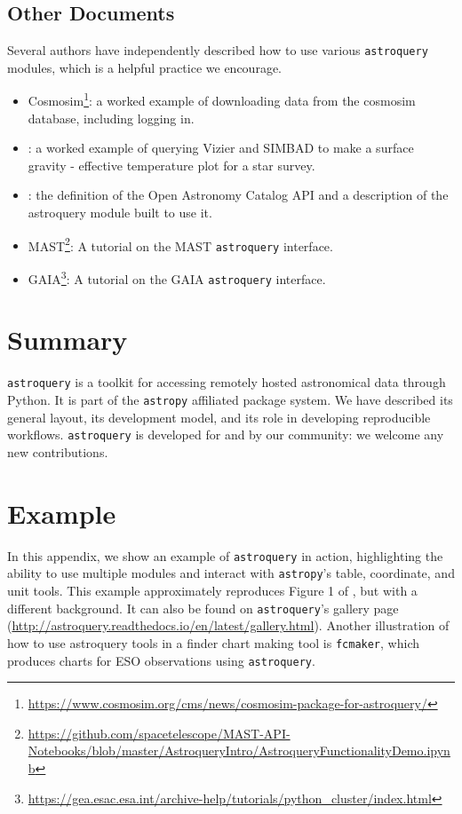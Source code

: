 \documentclass[twocolumn]{aastex62}
\newcommand{\package}[1]{\texttt{#1}\xspace}
\newcommand{\astroquery}{\package{astroquery}}
\newcommand{\astropypkg}{\package{astropy}}
\begin{document}
\subsection{Other Documents}
Several authors have independently described how to use various \astroquery
modules, which is a helpful practice we encourage.
 \begin{itemize}
    \item
        Cosmosim\footnote{\url{https://www.cosmosim.org/cms/news/cosmosim-package-for-astroquery/}}:
        a worked example of downloading data from the cosmosim database,
        including logging in.
    \item \citet{Paletou2014a}: a worked example of querying
        Vizier and SIMBAD to make a surface gravity - effective temperature
        plot for a star survey.
    \item \citet{Guillochon2018a}: the definition of
        the Open Astronomy Catalog API and a description of the astroquery
        module built to use it.
    \item
        MAST\footnote{\url{https://github.com/spacetelescope/MAST-API-Notebooks/blob/master/AstroqueryIntro/AstroqueryFunctionalityDemo.ipynb}}:
        A tutorial on the MAST \astroquery interface.
    \item GAIA\footnote{\url{https://gea.esac.esa.int/archive-help/tutorials/python_cluster/index.html}}:
        A tutorial on the GAIA \astroquery interface.
\end{itemize}


\section{Summary}
\astroquery is a toolkit for accessing remotely hosted astronomical
data through Python.  It is part of the \astropypkg affiliated package system.
We have described its general layout, its development model, and its role in
developing reproducible workflows.  \astroquery is developed for and by our
community: we welcome any new contributions.





\appendix
\section{Example}
\label{sec:example}
In this appendix, we show an example of \astroquery in action, highlighting the
ability to use multiple modules and interact with \astropypkg's table, coordinate,
and unit tools.  This example approximately reproduces Figure 1 of
\citet{Eisner2016a}, but with a different background.  It can also be found on
\astroquery's gallery page
(\url{http://astroquery.readthedocs.io/en/latest/gallery.html}).
Another illustration of how to use astroquery tools in a finder chart making
tool is \texttt{fcmaker}, which produces charts for ESO observations using
\astroquery \citep{Vogt2018a}.
\end{document}

